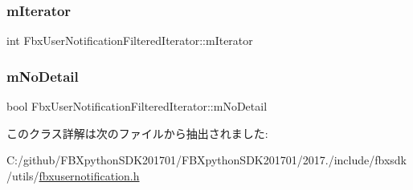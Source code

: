 \subsubsection{\texorpdfstring{m\+Iterator}{mIterator}}
{\footnotesize\ttfamily int Fbx\+User\+Notification\+Filtered\+Iterator\+::m\+Iterator\hspace{0.3cm}{\ttfamily [protected]}}

\mbox{\label{class_fbx_user_notification_filtered_iterator_ab38143eb6742f98d8462fdb83b9f6616}} 
\subsubsection{\texorpdfstring{m\+No\+Detail}{mNoDetail}}
{\footnotesize\ttfamily bool Fbx\+User\+Notification\+Filtered\+Iterator\+::m\+No\+Detail\hspace{0.3cm}{\ttfamily [protected]}}



このクラス詳解は次のファイルから抽出されました\+:\begin{DoxyCompactItemize}
\item 
C\+:/github/\+F\+B\+Xpython\+S\+D\+K201701/\+F\+B\+Xpython\+S\+D\+K201701/2017./include/fbxsdk/utils/\hyperlink{fbxusernotification_8h}{fbxusernotification.\+h}\end{DoxyCompactItemize}
